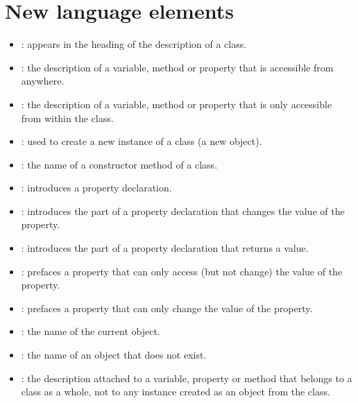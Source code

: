 	\section{New language elements}
		\begin{itemize}
			\item {}: appears in the heading of the description of a class.
			\item {}: the description of a variable, method or property that is accessible from anywhere.
			\item {}: the description of a variable, method or property that is only accessible from within the class.
			\item {}: used to create a new instance of a class (a new object).
			\item {}: the name of a constructor method of a class.
			\item {}: introduces a property declaration.
			\item {}: introduces the part of a property declaration that changes the value of the property.
			\item {}: introduces the part of a property declaration that returns a value.
			\item {}: prefaces a property that can only access (but not change) the value of the property.
			\item {}: prefaces a property that can only change the value of the property.
			\item {}: the name of the current object.
			\item {}: the name of an object that does not exist.
			\item {}: the description attached to a variable, property or method that belongs to a class as a whole, not to any instance created as an object from the class.
		\end{itemize}


